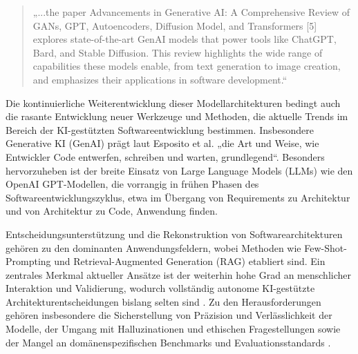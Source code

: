 \begin{quote}
    „...the paper Advancements in Generative AI: A Comprehensive Review of GANs, GPT, Autoencoders, Diffusion Model, and Transformers [5] explores state-of-the-art GenAI models that power tools like ChatGPT, Bard, and Stable Diffusion. This review highlights the wide range of capabilities these models enable, from text generation to image creation, and emphasizes their applications in software development.“
\end{quote}
\cite[S.~2]{donvir_role_2024}

Die kontinuierliche Weiterentwicklung dieser Modellarchitekturen bedingt auch
die rasante Entwicklung neuer Werkzeuge und Methoden, die aktuelle Trends im
Bereich der KI-gestützten Softwareentwicklung bestimmen. Insbesondere
Generative KI (GenAI) prägt laut Esposito et al.
\cite{esposito_generative_2025} „die Art und Weise, wie Entwickler Code
entwerfen, schreiben und warten, grundlegend“. Besonders hervorzuheben ist der
breite Einsatz von Large Language Models (LLMs) wie den OpenAI GPT-Modellen,
die vorrangig in frühen Phasen des Softwareentwicklungszyklus, etwa im Übergang
von Requirements zu Architektur und von Architektur zu Code, Anwendung finden.

Entscheidungsunterstützung und die Rekonstruktion von Softwarearchitekturen
gehören zu den dominanten Anwendungsfeldern, wobei Methoden wie
Few-Shot-Prompting und Retrieval-Augmented Generation (RAG) etabliert sind. Ein
zentrales Merkmal aktueller Ansätze ist der weiterhin hohe Grad an menschlicher
Interaktion und Validierung, wodurch vollständig autonome KI-gestützte
Architekturentscheidungen bislang selten sind
\cite[S.~2,~10]{esposito_generative_2025}. Zu den Herausforderungen gehören
insbesondere die Sicherstellung von Präzision und Verlässlichkeit der Modelle,
der Umgang mit Halluzinationen und ethischen Fragestellungen sowie der Mangel
an domänenspezifischen Benchmarks und Evaluationsstandards
\cite[S.~2,~16]{esposito_generative_2025}.

